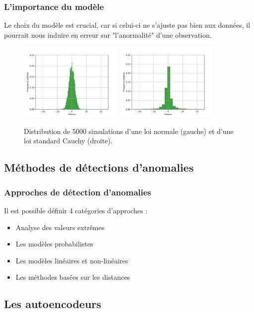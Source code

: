 \documentclass{beamer}
\begin{document}
	\begin{frame}
		\frametitle{L'importance du modèle}
		Le choix du modèle est crucial, car si celui-ci ne s’ajuste pas bien aux données, il pourrait nous induire en erreur sur "l’anormalité" d’une observation.
		\begin{figure}
			\includegraphics[width=5cm]{../rapports/images/histogram-normal-ztest}
			\includegraphics[width=5cm]{../rapports/images/histogram-cauchy-ztest}
			\caption{Distribution de 5000 simulations d'une loi normale (gauche) et d'une loi standard Cauchy (droite).}
		\end{figure}
	
	\end{frame}

	\subsection{Méthodes de détections d'anomalies}
	
	\begin{frame}
		\frametitle{Approches de détection d'anomalies}
		Il est possible définir 4 catégories d'approches \citep{10.5555/3086742}:
		\begin{itemize}
			\item Analyse des valeurs extrêmes
			\item Les modèles probabilistes
			\item Les modèles linéaires et non-linéaires
			\item Les méthodes basées sur les distances
		\end{itemize}
	\end{frame}

	\subsection{Les autoencodeurs}
	
\end{document}
